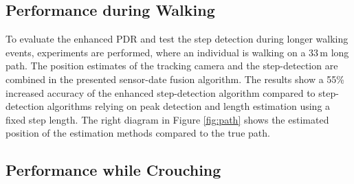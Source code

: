\documentclass[engproc,conferenceproceedings,submit,pdftex,moreauthors]{Definitions/mdpi}
\begin{document}
\subsection{Performance during Walking}

To evaluate the enhanced PDR and test the step detection during longer walking events, experiments are performed, where an individual is walking on a 33\,m long path. The position estimates of the tracking camera and the step-detection are combined in the presented sensor-date fusion algorithm.
The results show a 55\% increased accuracy of the enhanced step-detection algorithm compared to step-detection algorithms relying on peak detection and length estimation using a fixed step length. The right diagram in Figure \ref{fig:path} shows the estimated position of the estimation methods compared to the true path.

\subsection{Performance while Crouching} 
\end{document}
